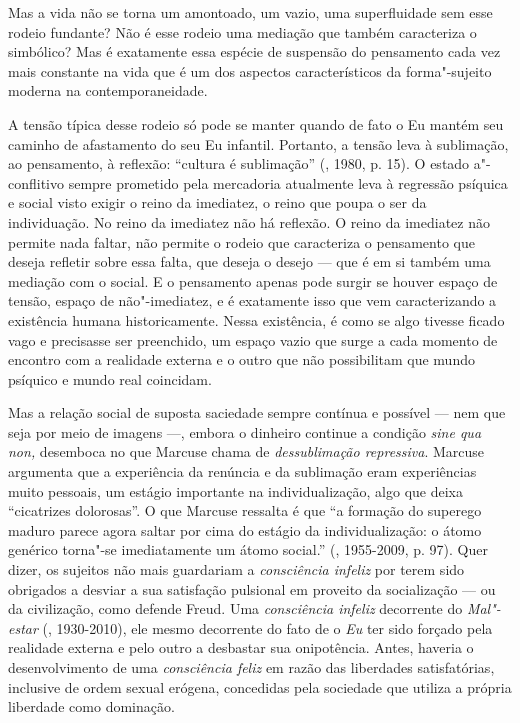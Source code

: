 Mas a vida não se torna um amontoado, um vazio, uma superfluidade sem
esse rodeio fundante? Não é esse rodeio uma mediação que também
caracteriza o simbólico? Mas é exatamente essa espécie de suspensão do
pensamento cada vez mais constante na vida que é um dos aspectos
característicos da forma"-sujeito moderna na contemporaneidade.

A tensão típica desse rodeio só pode se manter quando de fato o Eu
mantém seu caminho de afastamento do seu Eu infantil. Portanto, a tensão
leva à sublimação, ao pensamento, à reflexão: ``cultura é sublimação''
(, 1980, p. 15). O estado a"-conflitivo sempre prometido pela
mercadoria atualmente leva à regressão psíquica e social visto exigir o
reino da imediatez, o reino que poupa o ser da individuação. No reino da
imediatez não há reflexão. O reino da imediatez não permite nada faltar,
não permite o rodeio que caracteriza o pensamento que deseja refletir
sobre essa falta, que deseja o desejo --- que é em si também uma
mediação com o social. E o pensamento apenas pode surgir se houver
espaço de tensão, espaço de não"-imediatez, e é exatamente isso que vem
caracterizando a existência humana historicamente. Nessa existência, é
como se algo tivesse ficado vago e precisasse ser preenchido, um espaço
vazio que surge a cada momento de encontro com a realidade externa e o
outro que não possibilitam que mundo psíquico e mundo real coincidam.

Mas a relação social de suposta saciedade sempre contínua e possível ---
nem que seja por meio de imagens ---, embora o dinheiro continue a
condição \emph{sine qua non,} desemboca no que Marcuse chama de
\emph{dessublimação repressiva}. Marcuse argumenta que a experiência da
renúncia e da sublimação eram experiências muito pessoais, um estágio
importante na individualização, algo que deixa ``cicatrizes dolorosas''.
O que Marcuse ressalta é que ``a formação do superego maduro parece
agora saltar por cima do estágio da individualização: o átomo genérico
torna"-se imediatamente um átomo social.'' (, 1955-2009, p. 97).
Quer dizer, os sujeitos não mais guardariam a \emph{consciência infeliz}
por terem sido obrigados a desviar a sua satisfação pulsional em
proveito da socialização --- ou da civilização, como defende Freud. Uma
\emph{consciência infeliz} decorrente do \emph{Mal"-estar} (,
1930-2010), ele mesmo decorrente do fato de o \emph{Eu} ter sido forçado
pela realidade externa e pelo outro a desbastar sua onipotência. Antes,
haveria o desenvolvimento de uma \emph{consciência feliz} em razão das
liberdades satisfatórias, inclusive de ordem sexual erógena, concedidas
pela sociedade que utiliza a própria liberdade como dominação.

